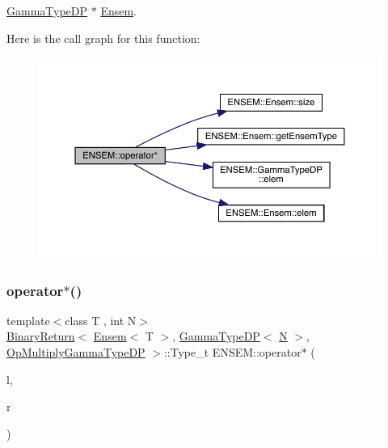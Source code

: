 \mbox{\hyperlink{classENSEM_1_1GammaTypeDP}{Gamma\+Type\+DP}} $\ast$ \mbox{\hyperlink{classENSEM_1_1Ensem}{Ensem}}. 

Here is the call graph for this function\+:\nopagebreak
\begin{figure}[H]
\begin{center}
\leavevmode
\includegraphics[width=350pt]{d1/d9e/group__eensem_ga53d61b0a5109e4f59f7b77a3fb4817f9_cgraph}
\end{center}
\end{figure}
\mbox{\label{group__eensem_ga28d880d590e554a96424952e16186000}} 
\subsubsection{\texorpdfstring{operator$\ast$()}{operator*()}\hspace{0.1cm}{\footnotesize\ttfamily [11/11]}}
{\footnotesize\ttfamily template$<$class T , int N$>$ \\
\mbox{\hyperlink{structENSEM_1_1BinaryReturn}{Binary\+Return}}$<$ \mbox{\hyperlink{classENSEM_1_1Ensem}{Ensem}}$<$ T $>$, \mbox{\hyperlink{classENSEM_1_1GammaTypeDP}{Gamma\+Type\+DP}}$<$ \mbox{\hyperlink{adat__devel_2lib_2hadron_2operator__name__util_8cc_a7722c8ecbb62d99aee7ce68b1752f337}{N}} $>$, \mbox{\hyperlink{structENSEM_1_1OpMultiplyGammaTypeDP}{Op\+Multiply\+Gamma\+Type\+DP}} $>$\+::Type\+\_\+t E\+N\+S\+E\+M\+::operator$\ast$ (\begin{DoxyParamCaption}\item[{const \mbox{\hyperlink{classENSEM_1_1Ensem}{Ensem}}$<$ T $>$ \&}]{l,  }\item[{const \mbox{\hyperlink{classENSEM_1_1GammaTypeDP}{Gamma\+Type\+DP}}$<$ \mbox{\hyperlink{adat__devel_2lib_2hadron_2operator__name__util_8cc_a7722c8ecbb62d99aee7ce68b1752f337}{N}} $>$ \&}]{r }\end{DoxyParamCaption})\hspace{0.3cm}{\ttfamily [inline]}}



